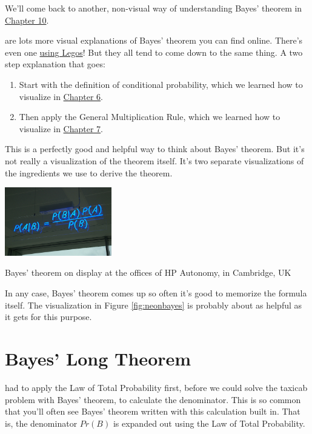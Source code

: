 \documentclass[justified]{tufte-book}
\providecommand{\tightlist}{%
  \setlength{\itemsep}{0pt}\setlength{\parskip}{0pt}}
\newcommand{\p}{Pr}
\theoremstyle{definition}
\theoremstyle{definition}
\theoremstyle{definition}
\theoremstyle{remark}
\begin{document}
We'll come back to another, non-visual way of understanding Bayes'
theorem in \protect\hyperlink{bayesibe}{Chapter 10}.

 are lots more visual explanations of Bayes' theorem
you can find online. There's even one
\href{https://www.countbayesie.com/blog/2015/2/18/bayes-theorem-with-lego}{using
Legos}! But they all tend to come down to the same thing. A two step
explanation that goes:

\begin{enumerate}
\def\labelenumi{\arabic{enumi}.}
\tightlist
\item
  Start with the definition of conditional probability, which we learned
  how to visualize in
  \protect\hyperlink{calculating-conditional-probability}{Chapter 6}.
\item
  Then apply the General Multiplication Rule, which we learned how to
  visualize in
  \protect\hyperlink{the-general-multiplication-rule}{Chapter 7}.
\end{enumerate}

This is a perfectly good and helpful way to think about Bayes' theorem.
But it's not really a visualization of the theorem itself. It's two
separate visualizations of the ingredients we use to derive the theorem.

\begin{marginfigure}
\includegraphics[width=1.83in]{img/neon_bayes} \caption[Bayes' theorem on display at the offices of HP Autonomy, in Cambridge, UK]{Bayes' theorem on display at the offices of HP Autonomy, in Cambridge, UK}\label{fig:neonbayes}
\end{marginfigure}

In any case, Bayes' theorem comes up so often it's good to memorize the
formula itself. The visualization in Figure \ref{fig:neonbayes} is
probably about as helpful as it gets for this purpose.

\hypertarget{bayes-long-theorem}{%
\section{Bayes' Long Theorem}\label{bayes-long-theorem}}

 had to apply the Law of Total Probability first, before
we could solve the taxicab problem with Bayes' theorem, to calculate the
denominator. This is so common that you'll often see Bayes' theorem
written with this calculation built in. That is, the denominator
\(\p(B)\) is expanded out using the Law of Total Probability.
\end{document}
